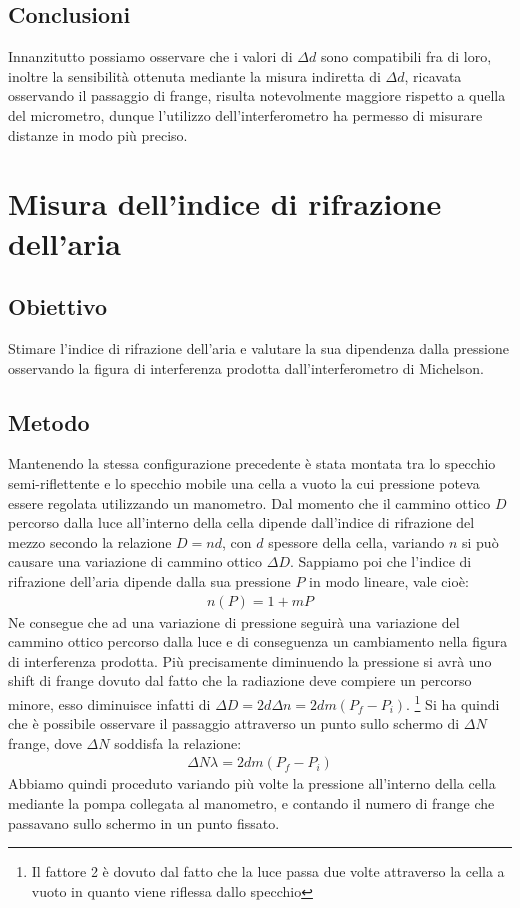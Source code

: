 \documentclass[a4paper]{article}
\begin{document}
\subsection{Conclusioni}
Innanzitutto possiamo osservare che i valori di $\Delta d$ sono compatibili fra di loro, inoltre la sensibilità ottenuta mediante la misura indiretta di $\Delta d$, ricavata osservando il passaggio di frange, risulta notevolmente maggiore rispetto a quella del micrometro, dunque l'utilizzo dell'interferometro ha permesso di misurare distanze in modo più preciso.

\section{Misura dell'indice di rifrazione dell'aria}
\subsection{Obiettivo}
Stimare l'indice di rifrazione dell'aria e valutare la sua dipendenza dalla pressione osservando la figura di interferenza prodotta dall'interferometro di Michelson.

\subsection{Metodo}
Mantenendo la stessa configurazione precedente è stata montata tra lo specchio semi-riflettente e lo specchio mobile una cella a vuoto la cui pressione poteva essere regolata utilizzando un manometro. Dal momento che il cammino ottico $D$ percorso dalla luce all'interno della cella dipende dall'indice di rifrazione del mezzo secondo la relazione $D=nd$, con $d$ spessore della cella, variando $n$ si può causare una variazione di cammino ottico $\Delta D$. Sappiamo poi che l'indice di rifrazione dell'aria dipende dalla sua pressione $P$ in modo lineare, vale cioè: 
\begin{align}
    n(P) = 1 + mP 
\end{align}
Ne consegue che ad una variazione di pressione seguirà una variazione del cammino ottico percorso dalla luce e di conseguenza un cambiamento nella figura di interferenza prodotta. Più precisamente diminuendo la pressione si avrà uno shift di frange dovuto dal fatto che la radiazione deve compiere un percorso minore, esso diminuisce infatti di $\Delta D= 2d \Delta n= 2dm(P_f-P_i)$. \footnote{Il fattore 2 è dovuto dal fatto che la luce passa due volte attraverso la cella a vuoto in quanto viene riflessa dallo specchio} 
Si ha quindi che è possibile osservare il passaggio attraverso un punto sullo schermo di $\Delta N$ frange, dove $\Delta N$ soddisfa la relazione:
\begin{align}
    \Delta N \lambda= 2dm(P_f-P_i)
\label{eq:shift-frange-pressione-aria}
\end{align}
Abbiamo quindi proceduto variando più volte la pressione all'interno della cella mediante la pompa collegata al manometro, e contando il numero di frange che passavano sullo schermo in un punto fissato.
\end{document}
